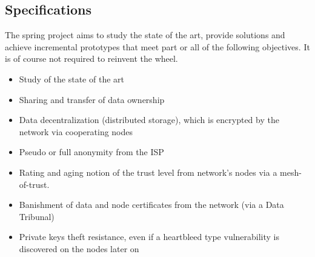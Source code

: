 
\subsection{Specifications}
The spring project aims to study the state of the art, provide solutions and achieve incremental prototypes that meet part or all of the following objectives. It is of course not required to reinvent the wheel.

\begin{itemize}
\item Study of the state of the art
\item Sharing and transfer of data ownership
\item Data decentralization (distributed storage), which is encrypted by the network via cooperating nodes 
\item Pseudo or full anonymity from the ISP
\item Rating and aging notion of the trust level from network's nodes via a mesh-of-trust.
\item Banishment of data and node certificates from the network (via a Data Tribunal)
\item Private keys  theft resistance, even if a heartbleed\cite{Mehta2014TheBug} type vulnerability is discovered on the nodes later on \cite{Sullivan2014StayingVulnerabilities}
\end{itemize}


